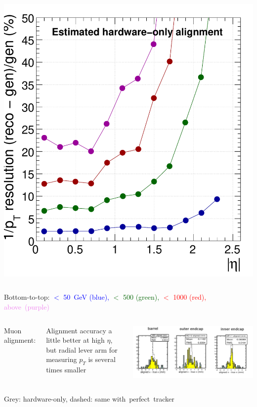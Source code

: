 \documentclass[compress]{beamer}
\begin{document}
\begin{frame}
\begin{columns}
\includegraphics[width=\linewidth]{curvature_byeta_zero.pdf}
\end{columns}

{\hspace{-0.5 cm} \small Bottom-to-top: \textcolor{blue}{$<$ 50~GeV (blue),} \textcolor{darkgreen}{$<$ 500 (green),} \textcolor{red}{$<$ 1000 (red),} \textcolor{violet}{\mbox{above (purple) \hspace{-2 cm}}}}

\vspace{0.3 cm}
\begin{columns}
Muon alignment:

\vspace{0.2 cm}
\scriptsize Alignment accuracy a little better at high $\eta$, but radial lever arm for measuring $p_T$ is several times smaller

\includegraphics[width=\linewidth]{muonhip_barrel-endcap.png}
\end{columns}

\scriptsize Grey: hardware-only,  dashed: same \mbox{with perfect tracker\hspace{-1 cm}}
\end{frame}
\end{document}
